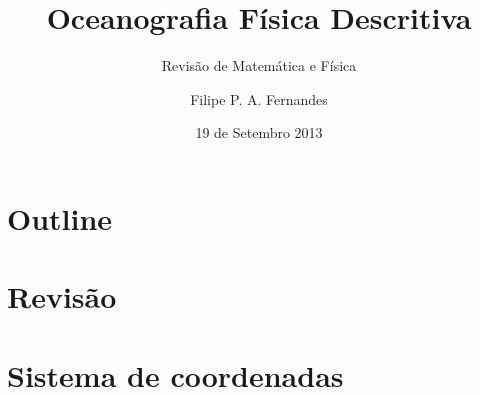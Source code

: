 \title[Aula 04]{Oceanografia Física Descritiva}
\subtitle{Revisão de Matemática e Física}
\author[Filipe Fernandes]{Filipe P. A. Fernandes}
\date[Setembro 2013]{19 de Setembro 2013}




\begin{frame}[plain]
  \titlepage
\end{frame}

\section*{Outline}
\begin{frame}
\tableofcontents
\end{frame}

\section{Revisão}
\section{Sistema de coordenadas}

